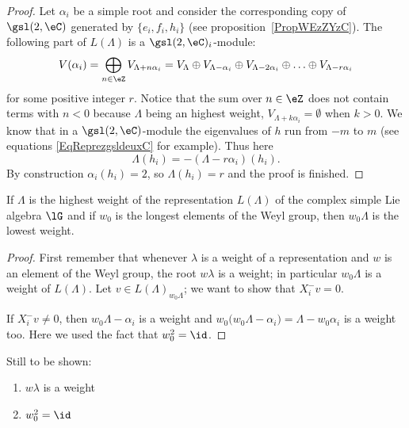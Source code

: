 \begin{proof}
    Let \( \alpha_i\) be a simple root and consider the corresponding copy of \( \gsl(2,\eC)\) generated by \( \{ e_i,f_i,h_i \}\) (see proposition~\ref{PropWEzZYzC}). The following part of \( L(\Lambda)\) is a \( \gsl(2,\eC)_i\)-module:
    \begin{equation}
        V(\alpha_i)=\bigoplus_{n\in\eZ}V_{\Lambda+n\alpha_i}=V_{\Lambda}\oplus V_{\Lambda-\alpha_i}\oplus V_{\Lambda-2\alpha_i}\oplus\ldots\oplus V_{\Lambda-r\alpha_i}
    \end{equation}
    for some positive integer \( r\). Notice that the sum over \( n\in\eZ\) does not contain terms with \( n<0\) because \( \Lambda\) being an highest weight, \( V_{\Lambda+k\alpha_i}=\emptyset\) when \( k>0\). We know that in a \( \gsl(2,\eC)\)-module the eigenvalues of \( h\) run from \( -m\) to \( m\) (see equations \eqref{EqReprezgsldeuxC} for example). Thus here
    \begin{equation}
        \Lambda(h_i)=-(\Lambda-r\alpha_i)(h_i).
    \end{equation}
    By construction \( \alpha_i(h_i)=2\), so \( \Lambda(h_i)=r\) and the proof is finished.
\end{proof}

\begin{proposition}
    If \( \Lambda\) is the highest weight of the representation \( L(\Lambda)\) of the complex simple Lie algebra \( \lG\) and if \( w_0\) is the longest elements of the Weyl group, then \( w_0\Lambda\) is the lowest weight.
\end{proposition}

\begin{proof}
    First remember that whenever \( \lambda\) is a weight of a representation and \( w\) is an element of the Weyl group, the root \( w\lambda\) is a weight; in particular \( w_0\Lambda\) is a weight of \( L(\Lambda)\).   Let \( v\in L(\Lambda)_{w_0\Lambda}\); we want to show that \( X_i^-v=0\).

    If \( X_i^-v\neq 0\), then \( w_0\Lambda-\alpha_i\) is a weight and \( w_0\big( w_0\Lambda-\alpha_i \big)=\Lambda-w_0\alpha_i\) is a weight too. Here we used the fact that \( w_0^2=\id\).
\end{proof}

\begin{probleme}
    Still to be shown:
    \begin{enumerate}
        \item
            \( w\lambda\) is a weight
        \item
            \( w_0^2=\id\)
    \end{enumerate}
\end{probleme}

